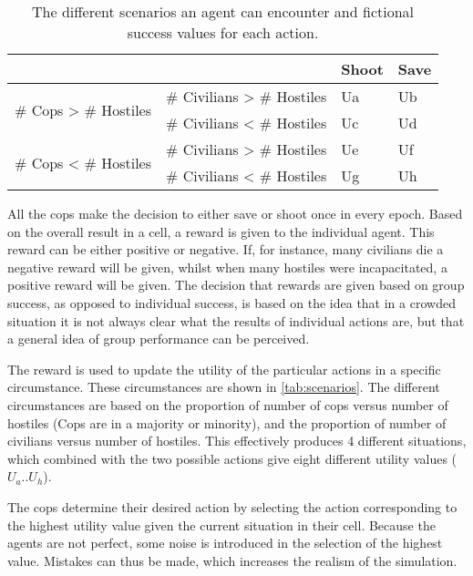 \begin{table}[!ht]
  \begin{center}
    \begin{tabular}{l l | l l}
      \hline
      & & Shoot & Save \\
      \hline
      \multirow{2}{*}{\# Cops > \# Hostiles} 
      & {\# Civilians > \# Hostiles} & Ua & Ub \\
      & {\# Civilians < \# Hostiles} & Uc & Ud \\
      \hline
      \multirow{2}{*}{\# Cops < \# Hostiles} 
      & {\# Civilians > \# Hostiles} & Ue & Uf \\
      & {\# Civilians < \# Hostiles} & Ug & Uh \\
      \hline
    \end{tabular}
    \caption{The different scenarios an agent can encounter and fictional success values for each action.
    }
    \label{tab:scenarios}
  \end{center}
\end{table}

All the cops make the decision to either save or shoot once in every epoch.
Based on the overall result in a cell, a reward is given to the individual agent.
This reward can be either positive or negative.
If, for instance, many civilians die a negative reward will be given, whilst when many hostiles were incapacitated, a positive reward will be given.
The decision that rewards are given based on group success, as opposed to individual success, is based on the idea that in a crowded situation it is not always clear what the results of individual actions are, but that a general idea of group performance can be perceived.

The reward is used to update the utility of the particular actions in a specific circumstance.
These circumstances are shown in \autoref{tab:scenarios}.
The different circumstances are based on the proportion of number of cops versus number of hostiles (Cops are in a majority or minority), 
and the proportion of number of civilians versus number of hostiles. 
This effectively produces 4 different situations, which combined with the two possible actions give eight different utility values ($U_a..U_h$).

The cops determine their desired action by selecting the action corresponding to the highest utility value given the current situation in their cell.
Because the agents are not perfect, some noise is introduced in the selection of the highest value.
Mistakes can thus be made, which increases the realism of the simulation.

